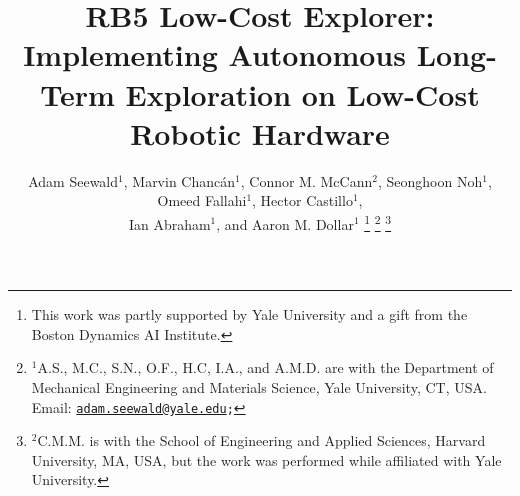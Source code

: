 \documentclass[letterpaper,10pt,conference,twoside]{IEEEtran}
\theoremstyle{definition}
\begin{document}

\title{\LARGE\bf RB5 Low-Cost Explorer: Implementing Autonomous Long-Term Exploration on Low-Cost Robotic Hardware}%

\author{Adam Seewald${}^\text{1}$, Marvin Chanc{\'a}n${}^\text{1}$, Connor M. McCann${}^\text{2}$, Seonghoon Noh${}^\text{1}$, Omeed Fallahi${}^\text{1}$, Hector Castillo${}^\text{1}$,\\ %
Ian Abraham${}^\text{1}$, and Aaron M. Dollar${}^\text{1}$%
  \thanks{This work was partly supported by Yale University and a gift from the Boston Dynamics AI Institute.}
  \thanks{${}^\text{1}$A.\hspace*{.4ex}S., M.\hspace*{.4ex}C., S.\hspace*{.4ex}N., O.\hspace*{.4ex}F., H.\hspace*{.4ex}C, I.\hspace*{.4ex}A., and A.\hspace*{.4ex}M.\hspace*{.4ex}D. are with the Department of Mechanical Engineering and Materials Science, Yale University, CT, USA. Email: {\tt\footnotesize \href{mailto:adam.seewald@yale.edu}{adam.seewald@yale.edu};}}
  \thanks{${}^\text{2}$C.\hspace*{.4ex}M.\hspace*{.4ex}M. is with the School of Engineering and Applied Sciences, Harvard University, MA, USA, but the work was performed while affiliated with Yale University.}
}
\end{document}
